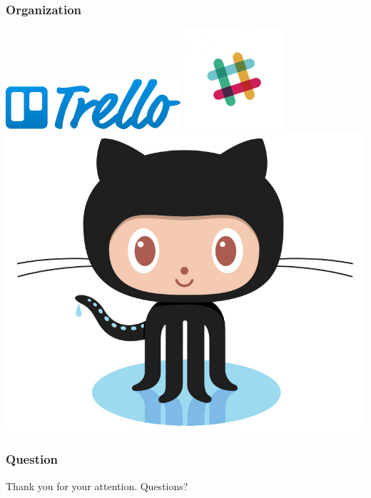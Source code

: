 \begin{frame}
	\frametitle{Organization}
	\begin{center}
	\includegraphics[scale=0.4]{figs/trello.png}
	\includegraphics[scale=0.4]{figs/slack.png}
	\includegraphics[scale=0.1]{figs/Octocat.jpg}
	\end{center}
\end{frame}

\begin{frame}
	\frametitle{Question}
	\begin{center}
		Thank you for your attention. Questions?
	\end{center}
\end{frame}